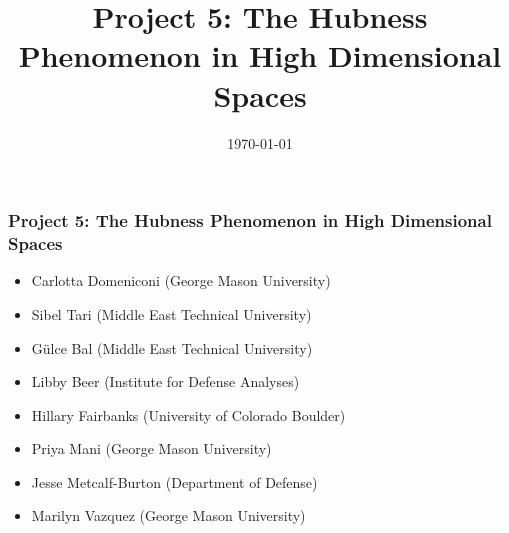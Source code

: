 \documentclass{beamer}
\title[Hubness]{Project 5: The Hubness Phenomenon in High Dimensional Spaces} %
\author{} %
\date{\today} %
\begin{document}
\begin{frame}
\titlepage %
\end{frame}






\begin{frame}
\frametitle{Project 5: The Hubness Phenomenon in High Dimensional Spaces}

\begin{itemize}
\item Carlotta Domeniconi (George Mason University)
\item Sibel Tari (Middle East Technical University)
\end{itemize}

\begin{itemize}
\item G\"{u}lce Bal (Middle East Technical University)
\item Libby Beer (Institute for Defense Analyses)
\item Hillary Fairbanks (University of Colorado Boulder)
\item Priya Mani (George Mason University)
\item Jesse Metcalf-Burton (Department of Defense)
\item Marilyn Vazquez (George Mason University)
\end{itemize}
\end{frame}
\end{document}
